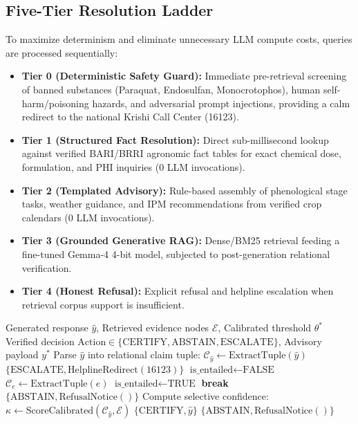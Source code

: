 \documentclass[11pt,a4paper]{article}
\begin{document}
\subsection{Five-Tier Resolution Ladder}
To maximize determinism and eliminate unnecessary LLM compute costs, queries are processed sequentially:
\begin{itemize}[leftmargin=1.5em]
    \item \textbf{Tier 0 (Deterministic Safety Guard):} Immediate pre-retrieval screening of banned substances (Paraquat, Endosulfan, Monocrotophos), human self-harm/poisoning hazards, and adversarial prompt injections, providing a calm redirect to the national Krishi Call Center (16123).
    \item \textbf{Tier 1 (Structured Fact Resolution):} Direct sub-millisecond lookup against verified BARI/BRRI agronomic fact tables for exact chemical dose, formulation, and PHI inquiries (0 LLM invocations).
    \item \textbf{Tier 2 (Templated Advisory):} Rule-based assembly of phenological stage tasks, weather guidance, and IPM recommendations from verified crop calendars (0 LLM invocations).
    \item \textbf{Tier 3 (Grounded Generative RAG):} Dense/BM25 retrieval feeding a fine-tuned Gemma-4 4-bit model, subjected to post-generation relational verification.
    \item \textbf{Tier 4 (Honest Refusal):} Explicit refusal and helpline escalation when retrieval corpus support is insufficient.
\end{itemize}

\begin{algorithm}[t]
\caption{Relation-Aware Verification and Calibrated Selective Certification}
\label{alg:verification}
\begin{algorithmic}[1]
\REQUIRE Generated response $\hat{y}$, Retrieved evidence nodes $\mathcal{E}$, Calibrated threshold $\theta^*$
\ENSURE Verified decision $\text{Action} \in \{\text{CERTIFY}, \text{ABSTAIN}, \text{ESCALATE}\}$, Advisory payload $y^*$
\STATE Parse $\hat{y}$ into relational claim tuple: $\mathcal{C}_{\hat{y}} \leftarrow \text{ExtractTuple}(\hat{y})$
    \RETURN $\{\text{ESCALATE}, \text{HelplineRedirect}(16123)\}$
\ENDIF
\STATE $\text{is\_entailed} \leftarrow \text{FALSE}$
    \STATE $\mathcal{C}_e \leftarrow \text{ExtractTuple}(e)$
        \STATE $\text{is\_entailed} \leftarrow \text{TRUE}$
        \STATE \textbf{break}
    \ENDIF
\ENDFOR
{}
    \RETURN $\{\text{ABSTAIN}, \text{RefusalNotice}()\}$
\ENDIF
\STATE Compute selective confidence: $\kappa \leftarrow \text{ScoreCalibrated}(\mathcal{C}_{\hat{y}}, \mathcal{E})$
\IF{$\kappa \ge \theta^*$}
    \RETURN $\{\text{CERTIFY}, \hat{y}\}$
\ELSE
    \RETURN $\{\text{ABSTAIN}, \text{RefusalNotice}()\}$
\ENDIF
\end{algorithmic}
\end{algorithm}
\end{document}
